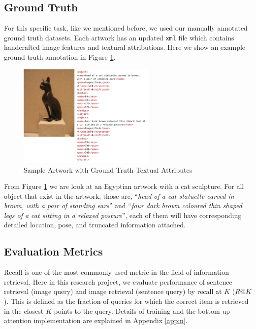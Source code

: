\subsection{Ground Truth}

For this specific task, like we mentioned before, we used our manually annotated ground truth datasets. Each artwork has an updated \verb|xml| file which contains handcrafted image features and textural attributions. Here we show an example ground truth annotation in Figure \ref{fig:sampledata}.

\begin{figure}[h!]
\centering
\includegraphics[width=0.6\textwidth]{sampledata.pdf}
\caption{Sample Artwork with Ground Truth Textual Attributes}
\label{fig:sampledata}
\end{figure}

From Figure \ref{fig:sampledata} we are look at an Egyptian artwork with a cat sculpture. For all object that exist in the artwork, those are, ``\textit{head of a	cat statuette carved in	brown, with	a pair of standing ears}'' and ``\textit{four dark brown coloured thin shaped legs of a cat sitting in a relaxed posture}'', each of them will have corresponding detailed location, pose, and truncated information attached. 

\subsection{Evaluation Metrics}

Recall is one of the most commonly used metric in the field of information retrieval. Here in this research project, we evaluate performance of sentence retrieval (image query) and image retrieval (sentence query) by recall at $K$ ($R@K$). This is defined as the fraction of queries for which the correct item is retrieved in the closest $K$ points to the query. Details of training and the bottom-up attention implementation are explained in Appendix \ref{app:n}.

